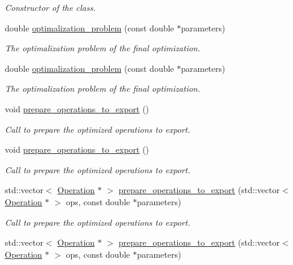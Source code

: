 \begin{DoxyCompactItemize}
\begin{DoxyCompactList}\small\item\em Constructor of the class. \end{DoxyCompactList}\item 
double \hyperlink{class_n___qubit___decomposition_a662b885a5930cd1e53975490ed65ed40}{optimalization\+\_\+problem} (const double $\ast$parameters)
\begin{DoxyCompactList}\small\item\em The optimalization problem of the final optimization. \end{DoxyCompactList}\item 
double \hyperlink{class_n___qubit___decomposition_a662b885a5930cd1e53975490ed65ed40}{optimalization\+\_\+problem} (const double $\ast$parameters)
\begin{DoxyCompactList}\small\item\em The optimalization problem of the final optimization. \end{DoxyCompactList}\item 
void \hyperlink{class_decomposition___base_a965838902240670119c0ad68d087c322}{prepare\+\_\+operations\+\_\+to\+\_\+export} ()
\begin{DoxyCompactList}\small\item\em Call to prepare the optimized operations to export. \end{DoxyCompactList}\item 
void \hyperlink{class_decomposition___base_a965838902240670119c0ad68d087c322}{prepare\+\_\+operations\+\_\+to\+\_\+export} ()
\begin{DoxyCompactList}\small\item\em Call to prepare the optimized operations to export. \end{DoxyCompactList}\item 
std\+::vector$<$ \hyperlink{class_operation}{Operation} $\ast$ $>$ \hyperlink{class_decomposition___base_a3efce739eaf575d284156813436bb469}{prepare\+\_\+operations\+\_\+to\+\_\+export} (std\+::vector$<$ \hyperlink{class_operation}{Operation} $\ast$ $>$ ops, const double $\ast$parameters)
\begin{DoxyCompactList}\small\item\em Call to prepare the optimized operations to export. \end{DoxyCompactList}\item 
std\+::vector$<$ \hyperlink{class_operation}{Operation} $\ast$ $>$ \hyperlink{class_decomposition___base_a68dcc2cdfa644cf8043021367cc07d28}{prepare\+\_\+operations\+\_\+to\+\_\+export} (std\+::vector$<$ \hyperlink{class_operation}{Operation} $\ast$ $>$ ops, const double $\ast$parameters)

\end{DoxyCompactItemize}
